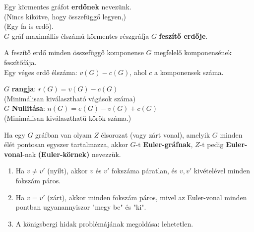 \begin{frame}
\begin{tcolorbox}[title={Erdő, Feszítő erdő}]
Egy körmentes gráfot \textbf{erdőnek} nevezünk.\\
(Nincs kikötve, hogy összefüggő legyen,)\\
(Egy fa is erdő).\\
\mmedskip
$G$ gráf maximállis élszámú körmentes részgráfja $G$ \textbf{feszítő erdője}.
\end{tcolorbox}

\begin{tcolorbox}[title={Ész}]
A feszítő erdő minden összefüggő komponense $G$ megfelelő komponensének feszítőfája.\\
\mmedskip
Egy véges erdő élszáma: $v(G) - c(G)$, ahol $c$ a komponensek száma.
\end{tcolorbox}

\begin{tcolorbox}[title={Rang, Nullitás}]
$G$ \textbf{rangja}: $r(G) = v(G) - c(G)$\\
(Minimálisan kiválasztható vágások száma)\\
\mmedskip
$G$ \textbf{Nullitása}: $n(G) = e(G) - v(G) + c(G)$\\
(Minimálisan kiválaszthatü körök száma.)
\end{tcolorbox}
\end{frame}

\begin{frame}
\begin{tcolorbox}[title={Def.: Euler gráfok}]
Ha egy $G$ gráfban van olyam $Z$ élsorozat (vagy zárt vonal), amelyik $G$ minden élét pontosan egyszer tartalmazza, akkor $G$-t \textbf{Euler-gráfnak}, $Z$-t pedig \textbf{Euler-vonal}-nak \textbf{(Euler-körnek)} nevezzük.
\end{tcolorbox}
\begin{tcolorbox}[title={Ész}]
\begin{enumerate}
\item Ha $v \neq v'$ (nyílt), akkor $v$ és $v'$ fokszáma páratlan, és $v, v'$ kivételével minden fokszám páros.
\item Ha $v = v'$ (zárt), akkor minden fokszám páros, mivel az Euler-vonal minden pontban ugyanannyiszor "megy be" és "ki".
\item A königsbergi hidak problémájának megoldása: lehetetlen.
\end{enumerate}
\end{tcolorbox}
\end{frame}

